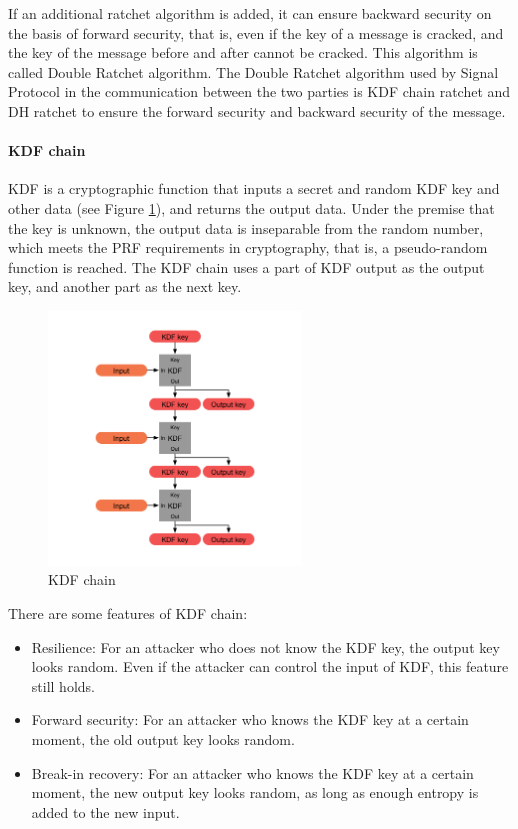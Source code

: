 \documentclass[11pt,en]{elegantpaper}
\begin{document}
If an additional ratchet algorithm is added, it can ensure backward security on the basis of forward security, that is, even if the key of a message is cracked, and the key of the message before and after cannot be cracked. This algorithm is called Double Ratchet algorithm. The Double Ratchet algorithm used by Signal Protocol in the communication between the two parties is KDF chain ratchet and DH ratchet to ensure the forward security and backward security of the message.

\paragraph{KDF chain}
KDF is a cryptographic function that inputs a secret and random KDF key and other data (see Figure \ref{kdfchain}), and returns the output data. Under the premise that the key is unknown, the output data is inseparable from the random number, which meets the PRF requirements in cryptography, that is, a pseudo-random function is reached. The KDF chain uses a part of KDF output as the output key, and another part as the next key.

\begin{figure}[H]
    \centering
    \includegraphics[width=0.6\textwidth]{image/KDFchain}
    \caption{KDF chain}
    \label{kdfchain}
\end{figure}

There are some features of KDF chain:
\begin{itemize}
    \item Resilience: For an attacker who does not know the KDF key, the output key looks random. Even if the attacker can control the input of KDF, this feature still holds.
    \item Forward security: For an attacker who knows the KDF key at a certain moment, the old output key looks random.
    \item Break-in recovery: For an attacker who knows the KDF key at a certain moment, the new output key looks random, as long as enough entropy is added to the new input.
\end{itemize}
\end{document}
